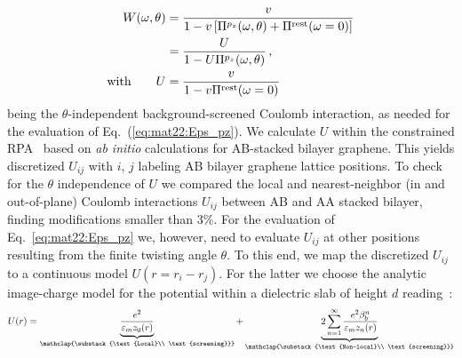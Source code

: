 \begin{align*}
    W(\omega, \theta) 
    &= \frac{v}{1 - v \left[\Pi^{p_z}(\omega, \theta) + \Pi^\text{rest}(\omega = 0)\right]}\\
    &= \frac{U}{1 - U \Pi^{p_z}(\omega, \theta)}\,, \notag \\
    \text{with} \qquad U &= \frac{v}{1 - v \Pi^\text{rest}(\omega = 0)}
\end{align*}
\noindent being the $\theta$-independent background-screened Coulomb interaction, as needed for the evaluation of Eq.~(\ref{eq:mat22:Eps_pz}). We calculate $U$ within the constrained RPA~\cite{cRPA} based on \textit{ab initio} calculations for AB-stacked bilayer graphene.%
This yields discretized $U_{ij}$ with $i$, $j$ labeling AB bilayer graphene lattice positions. To check for the $\theta$ independence of $U$ we compared the local and nearest-neighbor (in and out-of-plane) Coulomb interactions $U_{ij}$ between AB and AA stacked bilayer, finding modifications smaller than $3\%$. For the evaluation of Eq.~\eqref{eq:mat22:Eps_pz} we, however, need to evaluate $U_{ij}$ at other positions resulting from the finite twisting angle $\theta$. To this end, we map the discretized $U_{ij}$ to a continuous model $U(r = r_i - r_j)$. For the latter we choose the analytic image-charge model for the potential within a dielectric slab of height $d$ reading~\cite{keldysh_coulomb_1979,jena_enhancement_2007,emelyanenko_effect_2008,jiang_plasmonic_2021}:
\begin{equation} \label{eq:mat22:image-charge-model}
    U(r) =
        \underbrace{
            \frac{e^2}{\varepsilon_m z_0(r)}
        }_{\mathclap{\substack{\text{Local}\\ \text{screening}}}}
        + \underbrace{
            2 \sum_{n=1}^\infty \frac{e^2 \beta_b^n}{\varepsilon_m z_n(r)}
        }_{\mathclap{\substack{\text{Non-local}\\ \text{screening}}}}
\end{equation}
